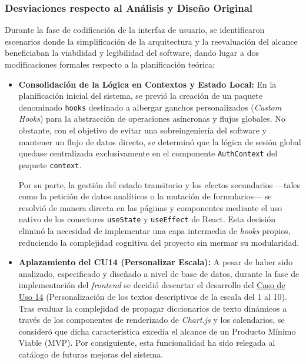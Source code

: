 \subsubsection{Desviaciones respecto al Análisis y Diseño Original}

Durante la fase de codificación de la interfaz de usuario, se identificaron escenarios donde la simplificación de la arquitectura y la reevaluación del alcance beneficiaban la viabilidad y legibilidad del software, dando lugar a dos modificaciones formales respecto a la planificación teórica:

\begin{itemize}
    \item \textbf{Consolidación de la Lógica en Contextos y Estado Local:} En la planificación inicial del sistema, se previó la creación de un paquete denominado \texttt{hooks} destinado a albergar ganchos personalizados (\textit{Custom Hooks}) para la abstracción de operaciones asíncronas y flujos globales. No obstante, con el objetivo de evitar una sobreingeniería del software y mantener un flujo de datos directo, se determinó que la lógica de sesión global quedase centralizada exclusivamente en el componente \texttt{AuthContext} del paquete \texttt{context}.

          Por su parte, la gestión del estado transitorio y los efectos secundarios —tales como la petición de datos analíticos o la mutación de formularios— se resolvió de manera directa en las páginas y componentes mediante el uso nativo de los conectores \texttt{useState} y \texttt{useEffect} de React. Esta decisión eliminó la necesidad de implementar una capa intermedia de \textit{hooks} propios, reduciendo la complejidad cognitiva del proyecto sin mermar su modularidad.

    \item \textbf{Aplazamiento del CU14 (Personalizar Escala):} A pesar de haber sido analizado, especificado y diseñado a nivel de base de datos, durante la fase de implementación del \textit{frontend} se decidió descartar el desarrollo del \hyperref[tab:esp_cu14]{Caso de Uso 14} (Personalización de los textos descriptivos de la escala del 1 al 10). Tras evaluar la complejidad de propagar diccionarios de texto dinámicos a través de los componentes de renderizado de \textit{Chart.js} y los calendarios, se consideró que dicha característica excedía el alcance de un Producto Mínimo Viable (MVP). Por consiguiente, esta funcionalidad ha sido relegada al catálogo de futuras mejoras del sistema.
\end{itemize}

